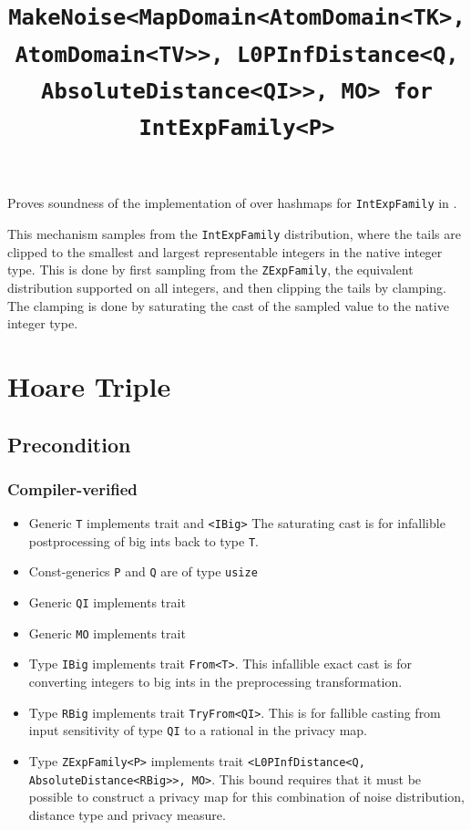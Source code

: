 \documentclass{article}
\title{\texttt{MakeNoise<MapDomain<AtomDomain<TK>, AtomDomain<TV>>, L0PInfDistance<Q, AbsoluteDistance<QI>>, MO> for IntExpFamily<P>}}
\author{\MichaelShoemateAuthor}
\date{}
\begin{document}
\maketitle

\contrib
Proves soundness of the implementation of  over hashmaps
for \texttt{IntExpFamily} in .

This mechanism samples from the \texttt{IntExpFamily} distribution,
where the tails are clipped to the smallest and largest representable integers in the native integer type.
This is done by first sampling from the \texttt{ZExpFamily}, the equivalent distribution supported on all integers,
and then clipping the tails by clamping.
The clamping is done by saturating the cast of the sampled value to the native integer type.

\section{Hoare Triple}
\subsection*{Precondition}
\subsubsection*{Compiler-verified}

\begin{itemize}
    \item Generic \texttt{T} implements trait  and \texttt{<IBig>}
        The saturating cast is for infallible postprocessing of big ints back to type \texttt{T}.
    \item Const-generics \texttt{P} and \texttt{Q} are of type \texttt{usize}
    \item Generic \texttt{QI} implements trait 
    \item Generic \texttt{MO} implements trait 
    \item Type \texttt{IBig} implements trait \texttt{From<T>}.
        This infallible exact cast is for converting integers to big ints in the preprocessing transformation.
    \item Type \texttt{RBig} implements trait \texttt{TryFrom<QI>}.
        This is for fallible casting from input sensitivity of type \texttt{QI} to a rational in the privacy map.
    \item Type \texttt{ZExpFamily<P>} implements trait \texttt{<L0PInfDistance<Q, AbsoluteDistance<RBig>>, MO>}.
        This bound requires that it must be possible to construct a privacy map for this combination of noise distribution, distance type and privacy measure.
\end{itemize}
\end{document}

